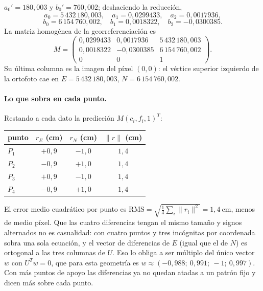 \(a_0'=180{,}003\) y \(b_0'=760{,}002\); deshaciendo la reducción,
\[
  a_0=5\,432\,180{,}003,\quad a_1=0{,}0299433,\quad a_2=0{,}0017936,
\]
\[
  b_0=6\,154\,760{,}002,\quad b_1=0{,}0018322,\quad b_2=-0{,}0300385 .
\]
La matriz homogénea de la georreferenciación es
\[
  M=\begin{pmatrix}0{,}0299433&0{,}0017936&5\,432\,180{,}003\\
  0{,}0018322&-0{,}0300385&6\,154\,760{,}002\\ 0&0&1\end{pmatrix}.
\]
Su última columna es la imagen del píxel \((0,0)\): el vértice superior izquierdo de la
ortofoto cae en \(E=5\,432\,180{,}003\), \(N=6\,154\,760{,}002\).

\paragraph{Lo que sobra en cada punto.} Restando a cada dato la predicción \(M(c_i,f_i,1)^T\):
\begin{center}
\begin{tabular}{lccc}
\toprule
punto & \(r_E\) (cm) & \(r_N\) (cm) & \(\lVert r\rVert\) (cm)\\
\midrule
\(P_1\) & \(+0{,}9\) & \(-1{,}0\) & \(1{,}4\)\\
\(P_2\) & \(-0{,}9\) & \(+1{,}0\) & \(1{,}4\)\\
\(P_3\) & \(+0{,}9\) & \(-1{,}0\) & \(1{,}4\)\\
\(P_4\) & \(-0{,}9\) & \(+1{,}0\) & \(1{,}4\)\\
\bottomrule
\end{tabular}
\end{center}
El error medio cuadrático por punto es
\(\mathrm{RMS}=\sqrt{\tfrac14\sum_i\lVert r_i\rVert^2}=1{,}4\ \mathrm{cm}\), menos de medio
píxel. Que las cuatro diferencias tengan el mismo tamaño y signos alternados no es casualidad:
con cuatro puntos y tres incógnitas por coordenada sobra una sola ecuación, y el vector de
diferencias de \(E\) (igual que el de \(N\)) es ortogonal a las tres columnas de \(U\). Eso lo
obliga a ser múltiplo del único vector \(w\) con \(U^Tw=0\), que para esta geometría es
\(w\approx(-0{,}988;\ 0{,}991;\ -1;\ 0{,}997)\). Con más puntos de apoyo las diferencias ya no
quedan atadas a un patrón fijo y dicen más sobre cada punto.

